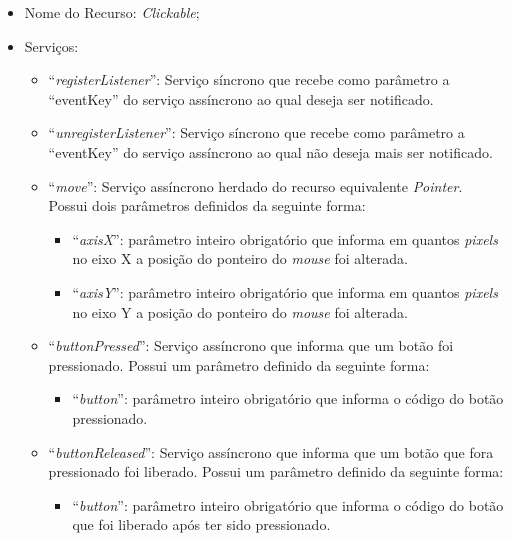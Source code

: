 \begin{itemize}
	
	\item Nome do Recurso: \emph{Clickable};

	\item Serviços:
		
		\begin{itemize}
			
			\item ``\emph{registerListener}'': Serviço síncrono que recebe como parâmetro a ``eventKey'' do serviço assíncrono ao qual deseja ser notificado.

			\item ``\emph{unregisterListener}'': Serviço síncrono que recebe como parâmetro a ``eventKey'' do serviço assíncrono ao qual não deseja mais ser notificado.

			\item ``\emph{move}'': Serviço assíncrono herdado do recurso equivalente \emph{Pointer}. Possui dois parâmetros definidos da seguinte forma:

				\begin{itemize}
					\item ``\emph{axisX}'': parâmetro inteiro obrigatório que informa em quantos \emph{pixels} no eixo X a posição do ponteiro do \emph{mouse} foi alterada.

					\item ``\emph{axisY}'': parâmetro inteiro obrigatório que informa em quantos \emph{pixels} no eixo Y a posição do ponteiro do \emph{mouse} foi alterada.
				\end{itemize}
			
			\item ``\emph{buttonPressed}'': Serviço assíncrono que informa que um botão foi pressionado. Possui um parâmetro definido da seguinte forma:

				\begin{itemize}
					\item ``\emph{button}'': parâmetro inteiro obrigatório que informa o código do botão pressionado.
				\end{itemize}
			
			\item ``\emph{buttonReleased}'': Serviço assíncrono que informa que um botão que fora pressionado foi liberado. Possui um parâmetro definido da seguinte forma:

				\begin{itemize}
					\item ``\emph{button}'': parâmetro inteiro obrigatório que informa o código do botão que foi liberado após ter sido pressionado.
				\end{itemize}

		\end{itemize}
\end{itemize}

